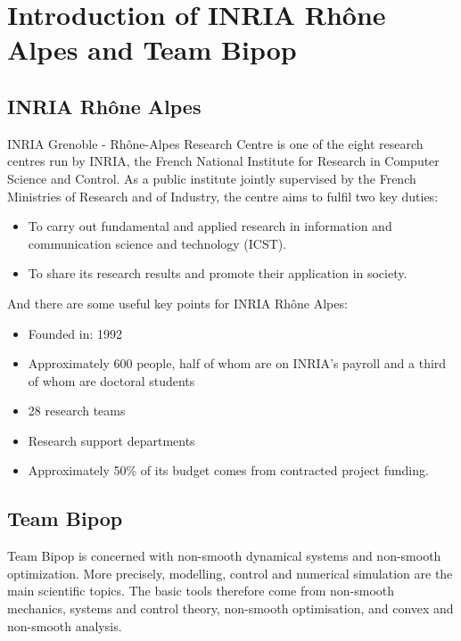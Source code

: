 \chapter{Introduction of INRIA Rh\^one Alpes and Team Bipop}
\ifpdf
    \graphicspath{{Chapter1/Chapter1Figs/PNG/}{Chapter1/Chapter1Figs/PDF/}{Chapter1/Chapter1Figs/}}
\else
    \graphicspath{{Chapter1/Chapter1Figs/EPS/}{Chapter1/Chapter1Figs/}}
\fi


\section{INRIA Rh\^one Alpes}

INRIA Grenoble - Rh\^one-Alpes Research Centre is one of the eight research centres run by INRIA, the French National Institute for Research in Computer Science and Control. As a public institute jointly supervised by the French Ministries of Research and of Industry, the centre aims to fulfil two key duties:

\begin{itemize}
\item To carry out fundamental and applied research in information and communication science and technology (ICST).
\item To share its research results and promote their application in society.
\end{itemize}

And there are some useful key points for INRIA Rh\^one Alpes:

\begin{itemize}
\item  Founded in: 1992
\item Approximately 600 people, half of whom are on INRIA's payroll and a third of whom are doctoral students
\item 28 research teams
\item Research support departments
\item Approximately 50\% of its budget comes from contracted project funding.
\end{itemize}

\section{Team Bipop}

Team Bipop is concerned with non-smooth dynamical systems and non-smooth optimization. More precisely, modelling, control and numerical simulation are the main scientific topics. The basic tools therefore come from non-smooth mechanics, systems and control theory, non-smooth optimisation, and convex and non-smooth analysis.\\



